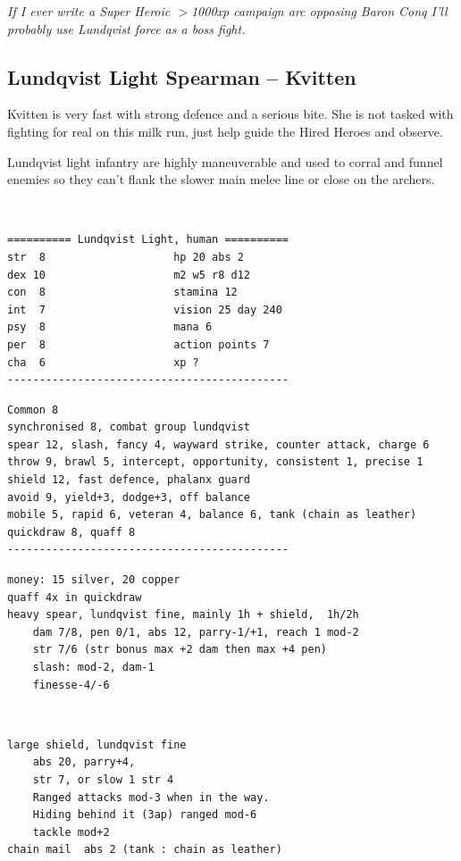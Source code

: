 \textit{If I ever write a Super Heroic $>$1000xp campaign arc opposing Baron Conq I'll probably use Lundqvist force as a boss fight.}


\subsection*{Lundqvist Light Spearman -- Kvitten}

Kvitten is very fast with strong defence and a serious bite. She is not tasked with fighting for real on this milk run, just help guide the Hired Heroes and observe.

Lundqvist light infantry are highly maneuverable and used to corral and funnel enemies so they can't flank the slower main melee line or close on the archers.

\

\goodbreak \small \begin{samepage} \begin{verbatim}
========== Lundqvist Light, human ==========
str  8                    hp 20 abs 2
dex 10                    m2 w5 r8 d12
con  8                    stamina 12
int  7                    vision 25 day 240
psy  8                    mana 6
per  8                    action points 7
cha  6                    xp ?
--------------------------------------------
\end{verbatim} \goodbreak \begin{verbatim}
Common 8
synchronised 8, combat group lundqvist
spear 12, slash, fancy 4, wayward strike, counter attack, charge 6
throw 9, brawl 5, intercept, opportunity, consistent 1, precise 1
shield 12, fast defence, phalanx guard
avoid 9, yield+3, dodge+3, off balance
mobile 5, rapid 6, veteran 4, balance 6, tank (chain as leather)
quickdraw 8, quaff 8
--------------------------------------------
\end{verbatim} \goodbreak \begin{verbatim}
money: 15 silver, 20 copper
quaff 4x in quickdraw
heavy spear, lundqvist fine, mainly 1h + shield,  1h/2h
    dam 7/8, pen 0/1, abs 12, parry-1/+1, reach 1 mod-2
    str 7/6 (str bonus max +2 dam then max +4 pen)
    slash: mod-2, dam-1
    finesse-4/-6
\end{verbatim} \end{samepage}   \   \goodbreak \begin{samepage} \begin{verbatim}
large shield, lundqvist fine
    abs 20, parry+4,
    str 7, or slow 1 str 4
    Ranged attacks mod-3 when in the way.
    Hiding behind it (3ap) ranged mod-6
    tackle mod+2
chain mail  abs 2 (tank : chain as leather)
\end{verbatim} \end{samepage} \normalsize

